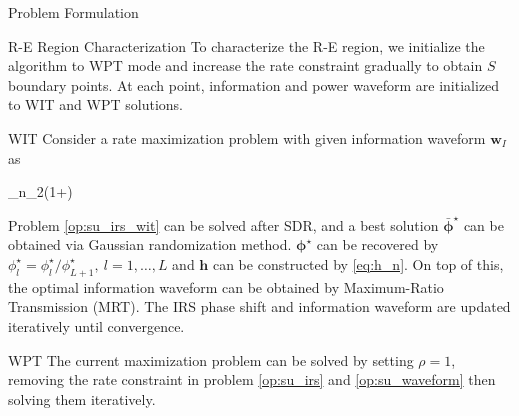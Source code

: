 \documentclass{IEEEtran}
\begin{document}
\begin{section}{Problem Formulation}
	\begin{subsection}{R-E Region Characterization}
		To characterize the R-E region, we initialize the algorithm to WPT mode and increase the rate constraint gradually to obtain $S$ boundary points. At each point, information and power waveform are initialized to WIT and WPT solutions.
		\begin{subsubsection}{WIT}
			Consider a rate maximization problem with given information waveform $\boldsymbol{w}_I$ as
			\begin{maxi!}
					{\boldsymbol{\Phi}}{\sum_{n}{\log_2\left(1+\right)}}{\label{op:su_irs_wit}}{}
				\end{maxi!}
			Problem \ref{op:su_irs_wit} can be solved after SDR, and a best solution $\bar{\boldsymbol{\phi}}^\star$ can be obtained via Gaussian randomization method. $\boldsymbol{\phi}^\star$ can be recovered by $\phi_l^\star=\phi_l^\star/\phi_{L+1}^\star, \ l=1,\dots,L$ and $\boldsymbol{h}$ can be constructed by \ref{eq:h_n}. On top of this, the optimal information waveform can be obtained by Maximum-Ratio Transmission (MRT). The IRS phase shift and information waveform are updated iteratively until convergence.
		\end{subsubsection}

		\begin{subsubsection}{WPT}
			The current maximization problem can be solved by setting $\rho = 1$, removing the rate constraint in problem \ref{op:su_irs} and \ref{op:su_waveform} then solving them iteratively.
		\end{subsubsection}


\end{subsection}
\end{section}
\end{document}
